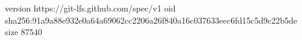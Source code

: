version https://git-lfs.github.com/spec/v1
oid sha256:91a9a88e932e0a64a69062cc2206a26f840a16c037633eec6fd15c5d9c22b5de
size 87540

